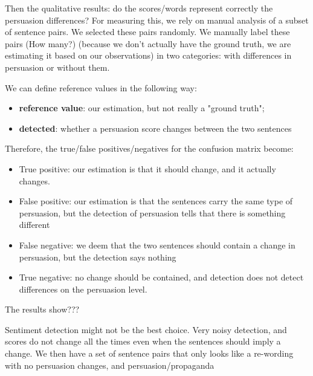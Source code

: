 

Then the qualitative results: do the scores/words represent correctly the persuasion differences? For measuring this, we rely on manual analysis of a subset of sentence pairs. We selected these pairs randomly. We manually label these pairs (How many?)
(because we don't actually have the ground truth, we are estimating it based on our observations) in two categories: with differences in persuasion or without them.

We can define reference values in the following way:

\begin{itemize}
    \item \textbf{reference value}: our estimation, but not really a "ground truth";
    \item \textbf{detected}: whether a persuasion score changes between the two sentences
\end{itemize}

Therefore, the true/false positives/negatives for the confusion matrix become:

\begin{itemize}
    \item True positive: our estimation is that it should change, and it actually changes.
    \item False positive: our estimation is that the sentences carry the same type of persuasion, but the detection of persuasion tells that there is something different
    \item False negative: we deem that the two sentences should contain a change in persuasion, but the detection says nothing
    \item True negative: no change should be contained, and detection does not detect differences on the persuasion level.
\end{itemize}

The results show???

Sentiment detection might not be the best choice. Very noisy detection, and scores do not change all the times even when the sentences should imply a change.
We then have a set of sentence pairs that only looks like a re-wording with no persuasion changes, and persuasion/propaganda 

